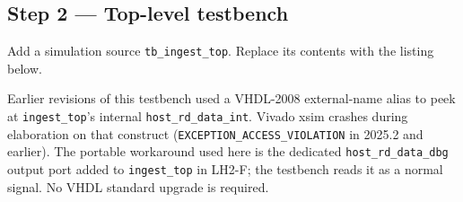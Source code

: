 \documentclass[11pt,letterpaper]{article}
\begin{document}
\subsection{Step 2 --- Top-level testbench}

Add a simulation source \texttt{tb\_ingest\_top}. Replace its contents with the listing below.

\begin{tcolorbox}[infobox={Why a debug port instead of a VHDL-2008 external name}]
Earlier revisions of this testbench used a VHDL-2008 external-name alias to peek at \texttt{ingest\_top}'s internal \texttt{host\_rd\_data\_int}. Vivado xsim crashes during elaboration on that construct (\texttt{EXCEPTION\_ACCESS\_VIOLATION} in 2025.2 and earlier). The portable workaround used here is the dedicated \texttt{host\_rd\_data\_dbg} output port added to \texttt{ingest\_top} in LH2-F; the testbench reads it as a normal signal. No VHDL standard upgrade is required.
\end{tcolorbox}
\end{document}
